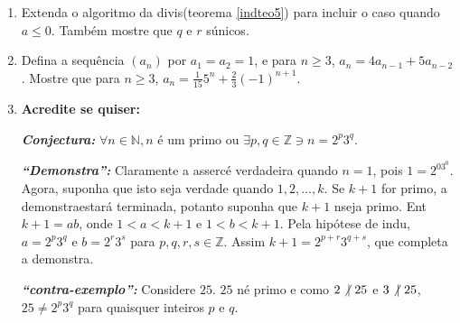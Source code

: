 \begin{enumerate}[{\bf 1.}]
\item Extenda o algoritmo da divis\ao (teorema \ref{indteo5}) para incluir o caso quando $a\leq 0$. Tamb\'em mostre que $q$ e $r$ s\ao \'unicos.

\item Defina a sequ\^encia $(a_n)$ por $a_1=a_2=1$, e para $n\geq 3$, $a_n=4a_{n-1}+5a_{n-2}$. Mostre que para $n\geq 3$, $a_n=\frac{1}{15}5^n+\frac{2}{3}(-1)^{n+1}$.

\item {\bf Acredite se quiser:}  

\noindent \textit{\textbf{Conjectura:}} $\forall n\in\mathbb{N}, n$ \'e um primo ou $\exists p,q\in\mathbb{Z} \ni n=2^p3^q$. 

\noindent \textit{\textbf{``Demonstra\caoi'':}} Claramente a asserc\ao \'e verdadeira quando $n=1$, pois $1=2^03^0$. Agora, suponha que isto seja verdade quando $1,2,\ldots,k$. Se $k+1$ for primo, a demonstra\cao estar\'a terminada, potanto suponha que $k+1$ n\ao seja primo. Ent\ao $k+1=ab$, onde $1<a<k+1$ e $1<b<k+1$. Pela hip\'otese de indu\caoi, $a=2^p3^q$ e $b=2^r3^s$ para $p,q,r,s\in\mathbb{Z}$. Assim $k+1=2^{p+r}3^{q+s}$, que completa a demonstra\caoi.

\noindent \textit{\textbf{``contra-exemplo'':}} Considere $25$. $25$ n\ao \'e primo e como $2\not|\textrm{ } 25$ e $3\not|\textrm{ } 25$, $25\neq 2^p3^q$ para quaisquer inteiros $p$ e $q$.
\end{enumerate}

